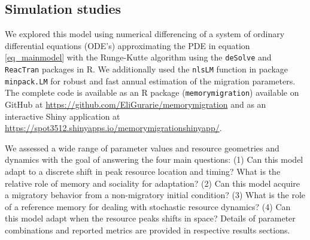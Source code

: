 \documentclass[utf8]{frontiersSCNS} %
\begin{document}
\subsection{Simulation studies}
	
	We explored this model using numerical differencing of a system of ordinary differential equations (ODE's) approximating the PDE in equation \ref{eq_mainmodel} with the Runge-Kutte algorithm using the \texttt{deSolve} \citep{Soetaert2010} and \texttt{ReacTran} \citep{Soetaert2012} packages in R. We additionally used the \texttt{nlsLM} function in package \texttt{minpack.LM} \citep{minpack.lm} for robust and fast annual estimation of the migration parameters. The complete code is available as an R package (\texttt{memorymigration}) available on GitHub at \url{https://github.com/EliGurarie/memorymigration} and as an interactive Shiny application at \url{https://spot3512.shinyapps.io/memorymigrationshinyapp/}.
	
	We assessed a wide range of parameter values and resource geometries and dynamics with the goal of answering the four main questions: (1) Can this model adapt to a discrete shift in peak resource location and timing?  What is the relative role of memory and sociality for adaptation? (2) Can this model acquire a migratory behavior from a non-migratory initial condition? (3) What is the role of a reference memory for dealing with stochastic resource dynamics? (4) Can this model adapt when the resource peaks shifts in space?  Details of parameter combinations and reported metrics are provided in respective results sections. 
	
\end{document}
